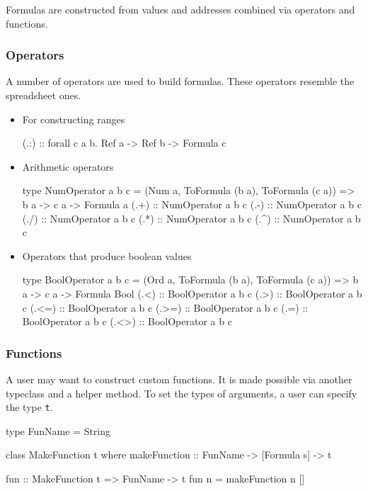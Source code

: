 Formulas are constructed from values and addresses combined via operators and functions.

\subsubsection{Operators}
\label{sec:operators}

A number of operators are used to build formulas. These operators resemble the spreadsheet ones.

\begin{itemize}
  \item For constructing ranges
  \begin{mycode}
  (.:) :: forall c a b. Ref a -> Ref b -> Formula c
  \end{mycode}
  \item Arithmetic operators
  \begin{mycode}
  type NumOperator a b c = (Num a, ToFormula (b a), ToFormula (c a)) => b a -> c a -> Formula a
  (.+) :: NumOperator a b c
  (.-) :: NumOperator a b c
  (./) :: NumOperator a b c
  (.*) :: NumOperator a b c
  (.^) :: NumOperator a b c
  \end{mycode}
  \item Operators that produce boolean values
  \begin{mycode}
  type BoolOperator a b c = (Ord a, ToFormula (b a), ToFormula (c a)) => b a -> c a -> Formula Bool
  (.<) :: BoolOperator a b c
  (.>) :: BoolOperator a b c
  (.<=) :: BoolOperator a b c
  (.>=) :: BoolOperator a b c
  (.=) :: BoolOperator a b c
  (.<>) :: BoolOperator a b c
  \end{mycode}
\end{itemize}

\subsubsection{Functions}

A user may want to construct custom functions. It is made possible via another typeclass and a helper method. To set the types of arguments, a user can specify the type \texttt{t}.

\begin{mycode}
type FunName = String

class MakeFunction t where
  makeFunction :: FunName -> [Formula s] -> t

fun :: MakeFunction t => FunName -> t
fun n = makeFunction n []
\end{mycode}

